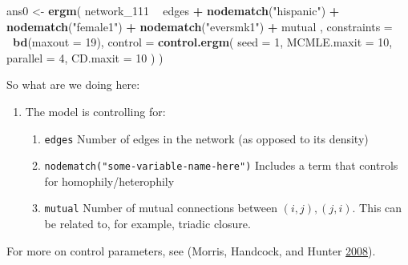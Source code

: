 \documentclass[]{book}
\newenvironment{Shaded}{\begin{snugshade}}{\end{snugshade}}
\newcommand{\DataTypeTok}[1]{\textcolor[rgb]{0.13,0.29,0.53}{#1}}
\newcommand{\DecValTok}[1]{\textcolor[rgb]{0.00,0.00,0.81}{#1}}
\newcommand{\KeywordTok}[1]{\textcolor[rgb]{0.13,0.29,0.53}{\textbf{#1}}}
\newcommand{\NormalTok}[1]{#1}
\newcommand{\OperatorTok}[1]{\textcolor[rgb]{0.81,0.36,0.00}{\textbf{#1}}}
\newcommand{\StringTok}[1]{\textcolor[rgb]{0.31,0.60,0.02}{#1}}
\begin{document}
\begin{Shaded}
\begin{Highlighting}[]
\NormalTok{ans0 <-}\StringTok{ }\KeywordTok{ergm}\NormalTok{(}
\NormalTok{  network_}\DecValTok{111} \OperatorTok{~}
\StringTok{    }\NormalTok{edges }\OperatorTok{+}
\StringTok{    }\KeywordTok{nodematch}\NormalTok{(}\StringTok{"hispanic"}\NormalTok{) }\OperatorTok{+}
\StringTok{    }\KeywordTok{nodematch}\NormalTok{(}\StringTok{"female1"}\NormalTok{) }\OperatorTok{+}
\StringTok{    }\KeywordTok{nodematch}\NormalTok{(}\StringTok{"eversmk1"}\NormalTok{) }\OperatorTok{+}
\StringTok{    }\NormalTok{mutual}
\NormalTok{    ,}
  \DataTypeTok{constraints =} \OperatorTok{~}\KeywordTok{bd}\NormalTok{(}\DataTypeTok{maxout =} \DecValTok{19}\NormalTok{),}
  \DataTypeTok{control =} \KeywordTok{control.ergm}\NormalTok{(}
    \DataTypeTok{seed        =} \DecValTok{1}\NormalTok{,}
    \DataTypeTok{MCMLE.maxit =} \DecValTok{10}\NormalTok{,}
    \DataTypeTok{parallel    =} \DecValTok{4}\NormalTok{,}
    \DataTypeTok{CD.maxit    =} \DecValTok{10}
\NormalTok{    )}
\NormalTok{  )}
\end{Highlighting}
\end{Shaded}

So what are we doing here:

\begin{enumerate}
\def\labelenumi{\arabic{enumi}.}
\item
  The model is controlling for:

  \begin{enumerate}
  \def\labelenumii{\alph{enumii}.}
  \item
    \texttt{edges} Number of edges in the network (as opposed to its density)
  \item
    \texttt{nodematch("some-variable-name-here")} Includes a term that controls for homophily/heterophily
  \item
    \texttt{mutual} Number of mutual connections between \((i, j), (j, i)\). This can be related to, for example, triadic closure.
  \end{enumerate}
\end{enumerate}

For more on control parameters, see (Morris, Handcock, and Hunter \protect\hyperlink{ref-Morris2008}{2008}).
\end{document}
